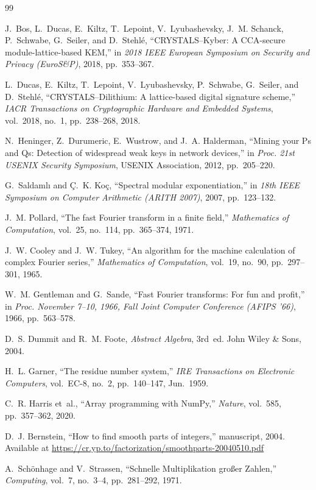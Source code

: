 \documentclass[runningheads]{llncs}
\begin{document}
\begin{thebibliography}{99}


J.~Bos, L.~Ducas, E.~Kiltz, T.~Lepoint, V.~Lyubashevsky, J.~M. Schanck,
P.~Schwabe, G.~Seiler, and D.~Stehl\'e,
``{CRYSTALS--Kyber}: A {CCA}-secure module-lattice-based {KEM},''
in \emph{2018 IEEE European Symposium on Security and Privacy (EuroS\&P)},
2018, pp.~353--367.

L.~Ducas, E.~Kiltz, T.~Lepoint, V.~Lyubashevsky, P.~Schwabe, G.~Seiler,
and D.~Stehl\'e,
``{CRYSTALS--Dilithium}: A lattice-based digital signature scheme,''
\emph{IACR Transactions on Cryptographic Hardware and Embedded Systems},
vol.~2018, no.~1, pp.~238--268, 2018.


N.~Heninger, Z.~Durumeric, E.~Wustrow, and J.~A. Halderman,
``Mining your {Ps} and {Qs}: Detection of widespread weak keys in network devices,''
in \emph{Proc. 21st USENIX Security Symposium},
USENIX Association, 2012, pp.~205--220.


G.~Saldaml{\i} and \c{C}.~K. Ko\c{c},
``Spectral modular exponentiation,''
in \emph{18th IEEE Symposium on Computer Arithmetic (ARITH 2007)},
2007, pp.~123--132.


J.~M. Pollard,
``The fast {F}ourier transform in a finite field,''
\emph{Mathematics of Computation}, vol.~25, no.~114, pp.~365--374, 1971.

J.~W. Cooley and J.~W. Tukey,
``An algorithm for the machine calculation of complex {F}ourier series,''
\emph{Mathematics of Computation}, vol.~19, no.~90, pp.~297--301, 1965.

W.~M. Gentleman and G.~Sande,
``Fast {F}ourier transforms: For fun and profit,''
in \emph{Proc. November 7--10, 1966, Fall Joint Computer Conference (AFIPS '66)},
1966, pp.~563--578.

D.~S. Dummit and R.~M. Foote,
\emph{Abstract Algebra}, 3rd~ed.
John Wiley \& Sons, 2004.

H.~L. Garner,
``The residue number system,''
\emph{IRE Transactions on Electronic Computers},
vol.~EC-8, no.~2, pp.~140--147, Jun.\ 1959.

C.~R. Harris et~al.,
``Array programming with {NumPy},''
\emph{Nature}, vol.~585, pp.~357--362, 2020.

D.~J. Bernstein,
``How to find smooth parts of integers,''
manuscript, 2004.
Available at \url{https://cr.yp.to/factorization/smoothparts-20040510.pdf}

A.~Sch{\"o}nhage and V.~Strassen,
``Schnelle {M}ultiplikation gro{\ss}er {Z}ahlen,''
\emph{Computing}, vol.~7, no.~3--4, pp.~281--292, 1971.

\end{thebibliography}
\end{document}
